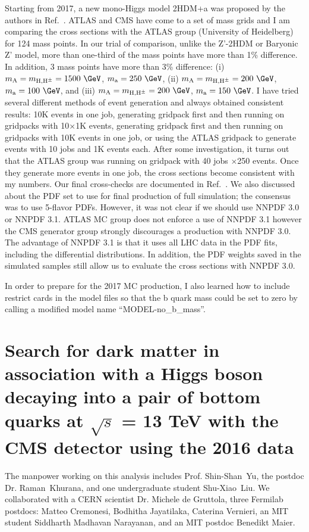 Starting from 2017, a new mono-Higgs model 2HDM+a was proposed by the authors in Ref.~\cite{2HDMa}. 
ATLAS and CMS have come to a set of mass grids and I am comparing the cross sections with 
the ATLAS group (University of Heidelberg) for 124 mass points. In our trial of comparison, unlike 
the Z'-2HDM or Baryonic Z' model, more than one-third of the mass points have more than 1\% difference.
In addition, 3 mass points have more than 3\% difference: (i) $m_\mathrm{A}=m_\mathrm{H,H^{\pm}}=1500~\GeV$, $m_\mathrm{a}=250~\GeV$, (ii) $m_\mathrm{A}=m_\mathrm{H,H^{\pm}}=200~\GeV$, $m_\mathrm{a}=100~\GeV$,
and (iii) $m_\mathrm{A}=m_\mathrm{H,H^{\pm}}=200~\GeV$, $m_\mathrm{a}=150~\GeV$. I have tried several 
different methods of event generation and always obtained consistent results: 10K events in one job, 
generating gridpack first and then running on gridpacks with 10$\times$1K events,  
generating gridpack first and then running on gridpacks with 10K events in one job, or 
using the ATLAS gridpack to generate events with 10 jobs and 1K events each. After some 
investigation, it turns out that the ATLAS group was running on gridpack with 40 jobs $\times$250 
events. Once they generate more events in one job, the cross sections become consistent with my 
numbers. Our final cross-checks are documented in Ref.~\cite{Eiko2HDMa}. We also discussed about the PDF set 
to use for final production of full simulation; the consensus was to use 5-flavor PDFs. However, it was not 
clear if we should use NNPDF 3.0 or NNPDF 3.1. ATLAS MC group does not enforce a use of NNPDF 3.1 however the CMS 
generator group strongly discourages a production with NNPDF 3.0. The advantage of NNPDF 3.1 is that it 
uses all LHC data in the PDF fits, including the differential \cPqt\cPaqt \pt distributions. In addition, the 
PDF weights saved in the simulated samples still allow us to evaluate the cross sections with NNPDF 3.0. 

In order to prepare for the 2017 MC production, I also learned how to include restrict cards in the model files so that the 
b quark mass could be set to zero by calling a modified model name ``MODEL-no\_b\_mass''. 


\section{Search for dark matter in association with a Higgs boson decaying into a pair of bottom quarks at $\sqrt{s}$ = 13 TeV with the CMS detector using the 2016 data}
The manpower working on this analysis includes Prof. Shin-Shan~Yu, the postdoc 
Dr. Raman~Khurana, and one undergraduate student Shu-Xiao~Liu. We collaborated with a CERN scientist 
Dr. Michele de Gruttola, three Fermilab postdocs: Matteo Cremonesi, Bodhitha Jayatilaka, 
Caterina Vernieri, an MIT student Siddharth Madhavan Narayanan, and an MIT postdoc Benedikt Maier. 

